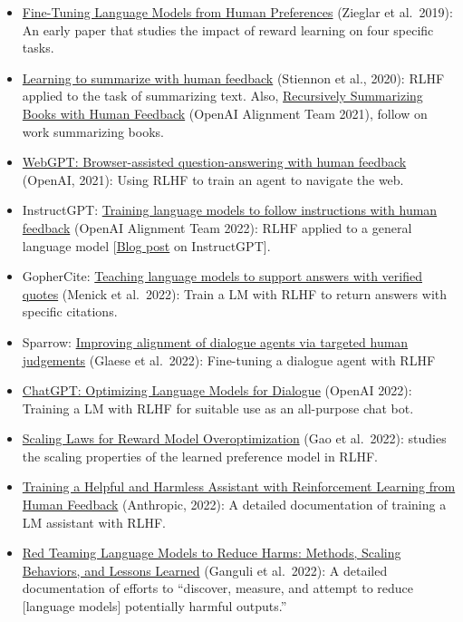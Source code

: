\documentclass[11pt,a4paper]{article}
\begin{document}
\begin{itemize}
\item
  \href{https://arxiv.org/abs/1909.08593}{Fine-Tuning Language Models from Human Preferences} (Zieglar et al.~2019): An early paper that studies the impact of reward learning on four specific tasks.
\item
  \href{https://proceedings.neurips.cc/paper/2020/hash/1f89885d556929e98d3ef9b86448f951-Abstract.html}{Learning to summarize with human feedback} (Stiennon et al., 2020): RLHF applied to the task of summarizing text. Also, \href{https://arxiv.org/abs/2109.10862}{Recursively Summarizing Books with Human Feedback} (OpenAI Alignment Team 2021), follow on work summarizing books.
\item
  \href{https://arxiv.org/abs/2112.09332}{WebGPT: Browser-assisted question-answering with human feedback} (OpenAI, 2021): Using RLHF to train an agent to navigate the web.
\item
  InstructGPT: \href{https://arxiv.org/abs/2203.02155}{Training language models to follow instructions with human feedback} (OpenAI Alignment Team 2022): RLHF applied to a general language model {[}\href{https://openai.com/blog/instruction-following/}{Blog post} on InstructGPT{]}.
\item
  GopherCite: \href{https://www.deepmind.com/publications/gophercite-teaching-language-models-to-support-answers-with-verified-quotes}{Teaching language models to support answers with verified quotes} (Menick et al.~2022): Train a LM with RLHF to return answers with specific citations.
\item
  Sparrow: \href{https://arxiv.org/abs/2209.14375}{Improving alignment of dialogue agents via targeted human judgements} (Glaese et al.~2022): Fine-tuning a dialogue agent with RLHF
\item
  \href{https://openai.com/blog/chatgpt/}{ChatGPT: Optimizing Language Models for Dialogue} (OpenAI 2022): Training a LM with RLHF for suitable use as an all-purpose chat bot.
\item
  \href{https://arxiv.org/abs/2210.10760}{Scaling Laws for Reward Model Overoptimization} (Gao et al.~2022): studies the scaling properties of the learned preference model in RLHF.
\item
  \href{https://arxiv.org/abs/2204.05862}{Training a Helpful and Harmless Assistant with Reinforcement Learning from Human Feedback} (Anthropic, 2022): A detailed documentation of training a LM assistant with RLHF.
\item
  \href{https://arxiv.org/abs/2209.07858}{Red Teaming Language Models to Reduce Harms: Methods, Scaling Behaviors, and Lessons Learned} (Ganguli et al.~2022): A detailed documentation of efforts to ``discover, measure, and attempt to reduce {[}language models{]} potentially harmful outputs.''

\end{itemize}
\end{document}
